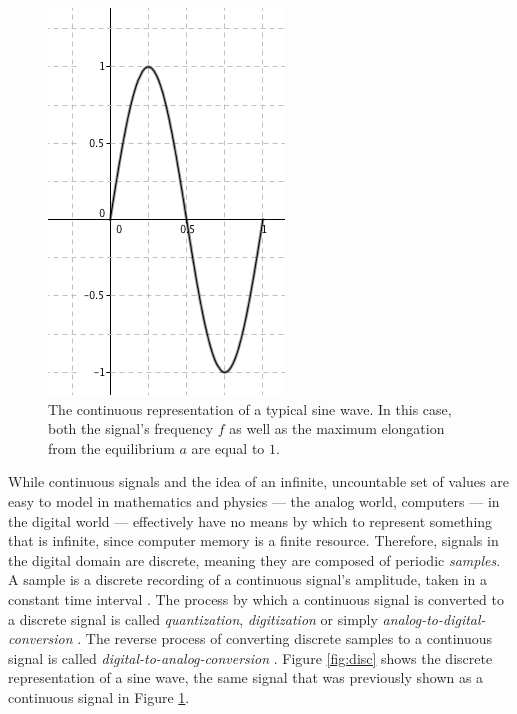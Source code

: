 \documentclass[12pt]{report}
\begin{document}
\begin{figure}[h!]

  \centering

  \includegraphics[scale=0.5]{img/cont}

  \caption{The continuous representation of a typical sine wave. In this case, both the signal's frequency $f$ as well as the maximum elongation from the equilibrium $a$ are equal to $1$. }

  \label{fig:cont}

\end{figure}

\pagebreak

While continuous signals and the idea of an infinite, uncountable set of values are easy to model in mathematics and physics --- the analog world, computers --- in the digital world --- effectively have no means by which to represent something that is infinite, since computer memory is a finite resource. Therefore, signals in the digital domain are discrete, meaning they are composed of periodic \emph{samples}. A sample is a discrete recording of a continuous signal's amplitude, taken in a constant time interval . The process by which a continuous signal is converted to a discrete signal is called \emph{quantization}, \emph{digitization} or simply \emph{analog-to-digital-conversion}  . The reverse process of converting discrete samples to a continuous signal is called \emph{digital-to-analog-conversion} . Figure \ref{fig:disc} shows the discrete representation of a sine wave, the same signal that was previously shown as a continuous signal in Figure \ref{fig:cont}.
\end{document}
